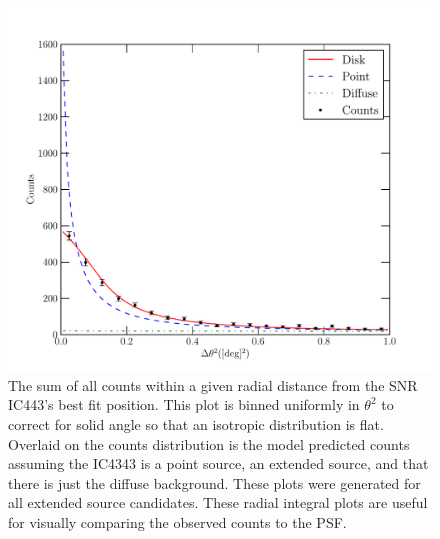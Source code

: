 \documentclass[12pt,preprint]{aastex}
\begin{document}
\clearpage
\begin{figure}
  \begin{center}
    \includegraphics{ic443_plots/ic443_radial_integral.pdf}
    \caption{The sum of all counts within a given radial distance from
    the SNR IC443's best fit position.  This plot is binned uniformly
    in $\theta^2$ to correct for solid angle so that an isotropic
    distribution is flat. Overlaid on the counts distribution is the
    model predicted counts assuming the IC4343 is a point source, an
    extended source, and that there is just the diffuse background.
    These plots were generated for all extended source candidates.
    These radial integral plots are useful for visually comparing the
    observed counts to the PSF.}
    \label{radial_profile}
  \end{center}
\end{figure}
\end{document}

